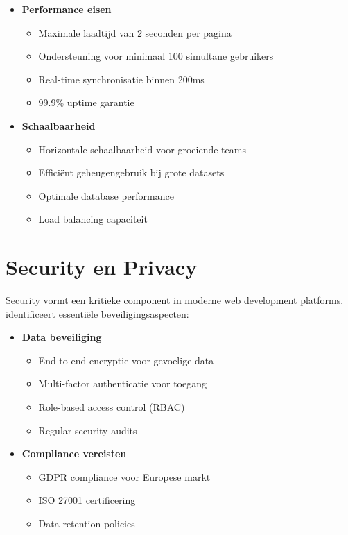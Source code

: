 \begin{itemize}
    \item \textbf{Performance eisen}
    \begin{itemize}
        \item Maximale laadtijd van 2 seconden per pagina
        \item Ondersteuning voor minimaal 100 simultane gebruikers
        \item Real-time synchronisatie binnen 200ms
        \item 99.9\% uptime garantie
    \end{itemize}
    
    \item \textbf{Schaalbaarheid}
    \begin{itemize}
        \item Horizontale schaalbaarheid voor groeiende teams
        \item Efficiënt geheugengebruik bij grote datasets
        \item Optimale database performance
        \item Load balancing capaciteit
    \end{itemize}
\end{itemize}

\section{Security en Privacy}
\label{sec:security}

Security vormt een kritieke component in moderne web development platforms. \textcite{Kumar2023} identificeert essentiële beveiligingsaspecten:

\begin{itemize}
    \item \textbf{Data beveiliging}
    \begin{itemize}
        \item End-to-end encryptie voor gevoelige data
        \item Multi-factor authenticatie voor toegang
        \item Role-based access control (RBAC)
        \item Regular security audits
    \end{itemize}
    
    \item \textbf{Compliance vereisten}
    \begin{itemize}
        \item GDPR compliance voor Europese markt
        \item ISO 27001 certificering
        \item Data retention policies
    \end{itemize}
\end{itemize}

